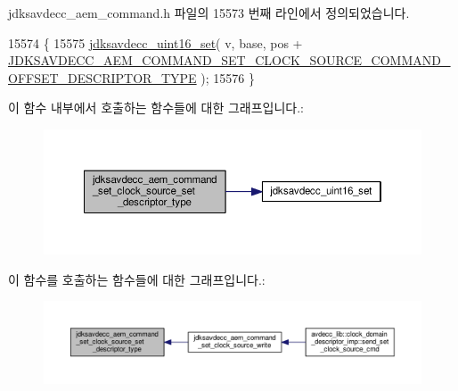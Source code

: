 jdksavdecc\+\_\+aem\+\_\+command.\+h 파일의 15573 번째 라인에서 정의되었습니다.


\begin{DoxyCode}
15574 \{
15575     \hyperlink{group__endian_ga14b9eeadc05f94334096c127c955a60b}{jdksavdecc\_uint16\_set}( v, base, pos + 
      \hyperlink{group__command__set__clock__source_ga3c06f98a46f6d736b6215fce4b980fd4}{JDKSAVDECC\_AEM\_COMMAND\_SET\_CLOCK\_SOURCE\_COMMAND\_OFFSET\_DESCRIPTOR\_TYPE}
       );
15576 \}
\end{DoxyCode}


이 함수 내부에서 호출하는 함수들에 대한 그래프입니다.\+:
\nopagebreak
\begin{figure}[H]
\begin{center}
\leavevmode
\includegraphics[width=350pt]{group__command__set__clock__source_ga9c97f2bc1c596cac06f216d107787ca1_cgraph}
\end{center}
\end{figure}




이 함수를 호출하는 함수들에 대한 그래프입니다.\+:
\nopagebreak
\begin{figure}[H]
\begin{center}
\leavevmode
\includegraphics[width=350pt]{group__command__set__clock__source_ga9c97f2bc1c596cac06f216d107787ca1_icgraph}
\end{center}
\end{figure}


